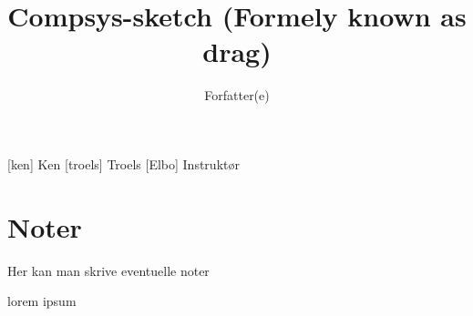 \documentclass[a4paper,11pt]{article}
\title{Compsys-sketch (Formely known as drag)}
\author{Forfatter(e)}
\begin{document}
\maketitle

\begin{roles}
[ken] Ken 
[troels] Troels
[Elbo] Instruktør
\end{roles} 

\section*{Noter}
Her kan man skrive eventuelle noter 

\begin{props}
\prop{}
\prop{}
\prop{}
\prop{}
\prop{}
\prop{}
\end{props}



\begin{sketch}

 lorem ipsum
\end{sketch}
\end{document}

